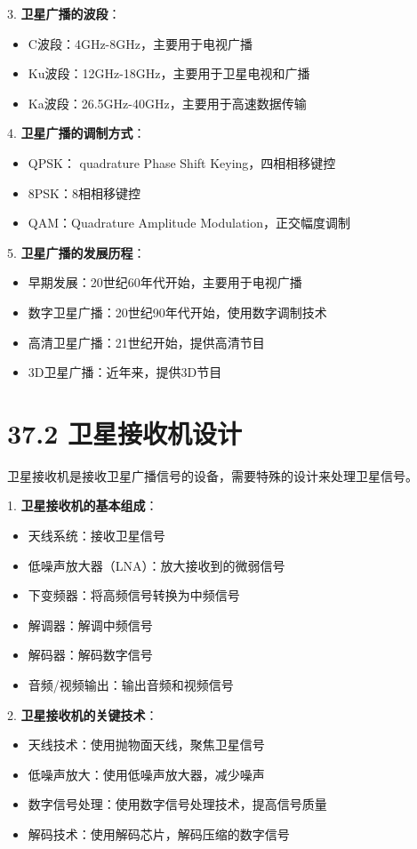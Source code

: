 \documentclass[12pt,UTF8]{ctexbook}
\begin{document}
3. \textbf{卫星广播的波段}：
   \begin{itemize}[leftmargin=3.5em]
   \item C波段：4GHz-8GHz，主要用于电视广播
   \item Ku波段：12GHz-18GHz，主要用于卫星电视和广播
   \item Ka波段：26.5GHz-40GHz，主要用于高速数据传输
   \end{itemize}

4. \textbf{卫星广播的调制方式}：
   \begin{itemize}[leftmargin=3.5em]
   \item QPSK： quadrature Phase Shift Keying，四相相移键控
   \item 8PSK：8相相移键控
   \item QAM：Quadrature Amplitude Modulation，正交幅度调制
   \end{itemize}

5. \textbf{卫星广播的发展历程}：
   \begin{itemize}[leftmargin=3.5em]
   \item 早期发展：20世纪60年代开始，主要用于电视广播
   \item 数字卫星广播：20世纪90年代开始，使用数字调制技术
   \item 高清卫星广播：21世纪开始，提供高清节目
   \item 3D卫星广播：近年来，提供3D节目
   \end{itemize}

\section*{37.2 卫星接收机设计}

卫星接收机是接收卫星广播信号的设备，需要特殊的设计来处理卫星信号。

1. \textbf{卫星接收机的基本组成}：
   \begin{itemize}[leftmargin=3.5em]
   \item 天线系统：接收卫星信号
   \item 低噪声放大器（LNA）：放大接收到的微弱信号
   \item 下变频器：将高频信号转换为中频信号
   \item 解调器：解调中频信号
   \item 解码器：解码数字信号
   \item 音频/视频输出：输出音频和视频信号
   \end{itemize}

2. \textbf{卫星接收机的关键技术}：
   \begin{itemize}[leftmargin=3.5em]
   \item 天线技术：使用抛物面天线，聚焦卫星信号
   \item 低噪声放大：使用低噪声放大器，减少噪声
   \item 数字信号处理：使用数字信号处理技术，提高信号质量
   \item 解码技术：使用解码芯片，解码压缩的数字信号
   \end{itemize}
\end{document}
